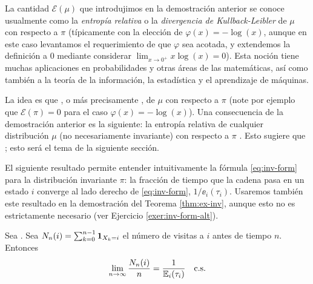 \begin{rem}\label{rem:entropia}
La cantidad $\mathcal{E}(\mu)$ que introdujimos en la demostración anterior se conoce usualmente como la \emph{entropía relativa} o la \emph{divergencia de Kullback-Leibler} de $\mu$ con respecto a $\pi$ (típicamente con la elección de $\varphi(x)=-\log(x)$, aunque en este caso levantamos el requerimiento de que $\varphi$ sea acotada, y extendemos la definición a $0$ mediante considerar $\lim_{x\to0^+}x\log(x)=0$).
Esta noción tiene muchas aplicaciones en probabilidades y otras áreas de las matemáticas, así como también a la teoría de la información, la estadística y el aprendizaje de máquinas.

\noindent La idea es que , o más precisamente , de $\mu$ con respecto a $\pi$ (note por ejemplo que $\mathcal{E}(\pi)=0$ para el caso $\varphi(x)=-\log(x)$).
Una consecuencia de la demostración anterior es la siguiente: la entropía relativa de cualquier distribución $\mu$ (no necesariamente invariante) con respecto a $\pi$ .
Esto sugiere que ; esto será el tema de la siguiente sección.
\end{rem}

El siguiente resultado permite entender intuitivamente la fórmula \eqref{eq:inv-form} para la distribución invariante $\pi$: la fracción de tiempo que la cadena pasa en un estado $i$ converge al lado derecho de \eqref{eq:inv-form}, $1/\ee_i(\tau_i)$.
Usaremos también este resultado en la demostración del Teorema \ref{thm:ex-inv}, aunque esto no es estrictamente necesario (ver Ejercicio \ref{exer:inv-form-alt}).

\begin{prop}\label{prop:timeconv}
Sea .
Sea $N_n(i)=\sum_{k=0}^{n-1}\mathbf{1}_{X_k=i}$ el número de visitas a $i$ antes de tiempo $n$.
Entonces
\[\lim_{n\to\infty}\frac{N_n(i)}{n}=\frac1{\mathbb{E}_i(\tau_i)}\quad\text{\upshape{c.s.}}\]
\end{prop}

